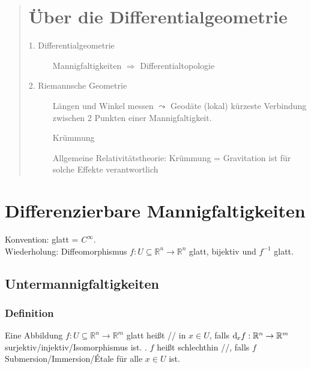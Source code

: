 
\newcommand{\fach}{Differentialgeometrie \RM{1}.}
\newcommand{\semester}{WiSe 2014}
\newcommand{\homepage}{https://wwwmath.uni-muenster.de/u/frederik.witt/diffgeoI.html}
\newcommand{\prof}{Frederik Witt}
\newcommand{\verfasser}{Arne Grauer}




\maketitle
\begin{abstract}

\section*{Über die Differentialgeometrie}
\begin{description}
	\item[1. Differentialgeometrie] Mannigfaltigkeiten $\Rightarrow $ Differentialtopologie
	\item[2. Riemannsche Geometrie] Längen und Winkel messen $\leadsto$ Geodäte (lokal) kürzeste Verbindung zwischen 2 Punkten einer Mannigfaltigkeit.
	
	Krümmung
	
	Allgemeine Relativitätstheorie: Krümmung = Gravitation ist für solche Effekte verantwortlich
\end{description}
\end{abstract}

\setcounter{page}{1}
\tableofcontents
\cleardoubleoddemptypage
{}
\setcounter{page}{1}


\section{Differenzierbare Mannigfaltigkeiten} %
\label{sec:1}
Konvention: glatt = $C^\infty$.\\
Wiederholung: Diffeomorphismus $f : U \subseteq \mathds{R}^n \to \mathds{R}^n$ glatt, bijektiv und $f ^{-1}$ glatt.

\subsection{Untermannigfaltigkeiten} %
\label{sub:11}

\subsubsection[Definition: Submersion, Immersion und Étale]{Definition} %
\label{ssub:11}
Eine Abbildung $f : U \subseteq \mathds{R}^n \to \mathds{R}^m$ glatt heißt // in $x \in U$, falls
$\mathrm{d}\mkern-1.0mu_x f : \mathbb{R}^n \to \mathbb{R}^m$ surjektiv/injektiv/Isomorphismus ist. . $f$ heißt schlechthin
//, falls $f$ Submersion/Immersion/Étale für alle $x \in U$ ist.

